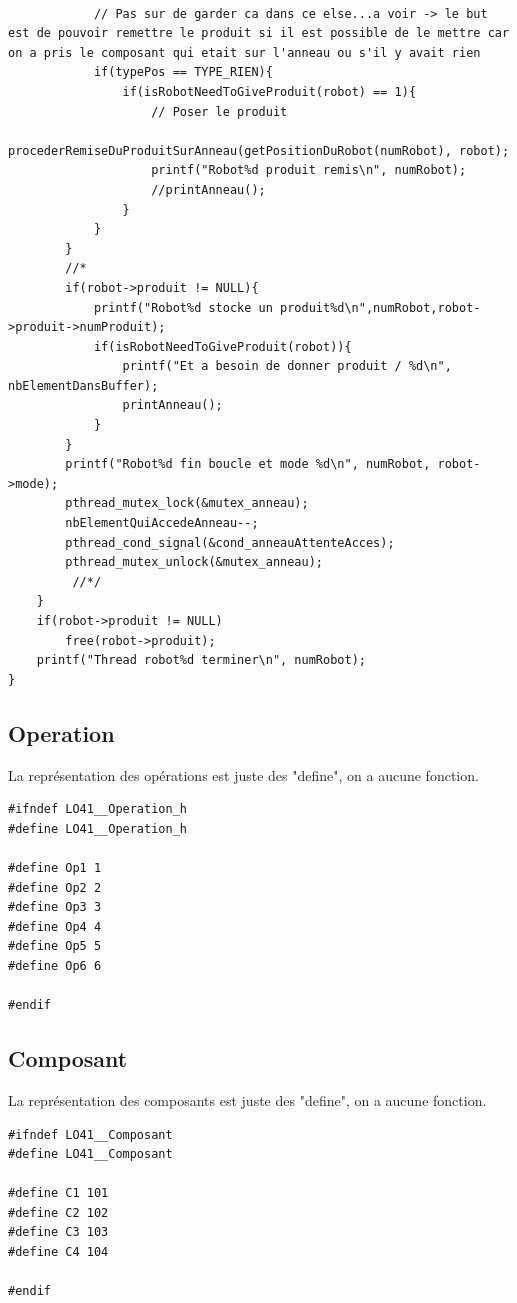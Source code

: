 \documentclass{report}
\begin{document}
\begin{lstlisting}[caption=Fonction thread des robots]
            
            // Pas sur de garder ca dans ce else...a voir -> le but est de pouvoir remettre le produit si il est possible de le mettre car on a pris le composant qui etait sur l'anneau ou s'il y avait rien
            if(typePos == TYPE_RIEN){
                if(isRobotNeedToGiveProduit(robot) == 1){
                    // Poser le produit
                    procederRemiseDuProduitSurAnneau(getPositionDuRobot(numRobot), robot);
                    printf("Robot%d produit remis\n", numRobot);
                    //printAnneau();
                }
            }
        }
        //*
        if(robot->produit != NULL){
            printf("Robot%d stocke un produit%d\n",numRobot,robot->produit->numProduit);
            if(isRobotNeedToGiveProduit(robot)){
                printf("Et a besoin de donner produit / %d\n", nbElementDansBuffer);
                printAnneau();
            }
        }
        printf("Robot%d fin boucle et mode %d\n", numRobot, robot->mode);
        pthread_mutex_lock(&mutex_anneau);
        nbElementQuiAccedeAnneau--;
        pthread_cond_signal(&cond_anneauAttenteAcces);
        pthread_mutex_unlock(&mutex_anneau);
         //*/
    }
    if(robot->produit != NULL)
        free(robot->produit);
    printf("Thread robot%d terminer\n", numRobot);
}
\end{lstlisting}
\subsection{Operation}
La représentation des opérations est juste des "define", on a aucune fonction.
\begin{lstlisting}[caption=Représentation des opérations]
#ifndef LO41__Operation_h
#define LO41__Operation_h

#define Op1 1
#define Op2 2
#define Op3 3
#define Op4 4
#define Op5 5
#define Op6 6

#endif
\end{lstlisting}

\subsection{Composant}
La représentation des composants est juste des "define", on a aucune fonction.
\begin{lstlisting}[caption=Représentation des composants]
#ifndef LO41__Composant
#define LO41__Composant

#define C1 101
#define C2 102
#define C3 103
#define C4 104

#endif 
\end{lstlisting}
\end{document}
